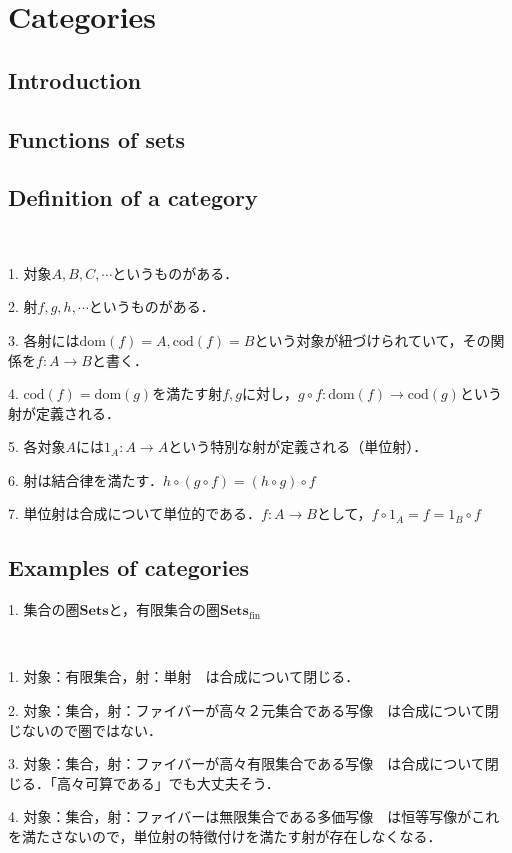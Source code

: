 \documentclass[uplatex, 12pt, dvipdfmx]{jsarticle}
\title{}
\author{司馬博文 J4-190549\\hirofumi-shiba48@g.ecc.u-tokyo.ac.jp}
\date{\today}
\begin{document}
\tableofcontents

\section{Categories}

\subsection{Introduction}
\subsection{Functions of sets}
\subsection{Definition of a category}
\begin{definition}[Category]　

    1. 対象$A,B,C,\cdots$というものがある．

    2. 射$f,g,h,\cdots$というものがある．

    3. 各射には$\mathrm{dom}(f)=A, \mathrm{cod}(f)=B$という対象が紐づけられていて，その関係を$f:A\to B$と書く．

    4. $\mathrm{cod}(f)=\mathrm{dom}(g)$を満たす射$f,g$に対し，$g\circ f:\mathrm{dom}(f)\to \mathrm{cod}(g)$という射が定義される．

    5. 各対象$A$には$1_A:A\to A$という特別な射が定義される（単位射）．

    6. 射は結合律を満たす．$h\circ (g\circ f)=(h\circ g)\circ f$

    7. 単位射は合成について単位的である．$f:A\to B$として，$f\circ 1_A=f=1_B\circ f$
\end{definition}

\subsection{Examples of categories}

1. 集合の圏$\mathbf{Sets}$と，有限集合の圏$\mathbf{Sets}_\mathrm{fin}$
\begin{example*}　

    1. 対象：有限集合，射：単射　は合成について閉じる．

    2. 対象：集合，射：ファイバーが高々２元集合である写像　は合成について閉じないので圏ではない．

    3. 対象：集合，射：ファイバーが高々有限集合である写像　は合成について閉じる．「高々可算である」でも大丈夫そう．

    4. 対象：集合，射：ファイバーは無限集合である多価写像　は恒等写像がこれを満たさないので，単位射の特徴付けを満たす射が存在しなくなる．
\end{example*}
\end{document}
